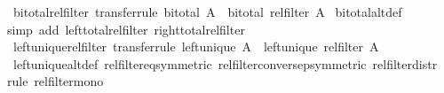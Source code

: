 \begin{isabellebody}
{\isafoldproof}%
%
\isadelimproof
\isanewline
%
\endisadelimproof
\isanewline
{}\isamarkupfalse%
\ bi{\isacharunderscore}{\kern0pt}total{\isacharunderscore}{\kern0pt}rel{\isacharunderscore}{\kern0pt}filter\ {\isacharbrackleft}{\kern0pt}transfer{\isacharunderscore}{\kern0pt}rule{\isacharbrackright}{\kern0pt}{\isacharcolon}{\kern0pt}\ {\isachardoublequoteopen}bi{\isacharunderscore}{\kern0pt}total\ A\ {\isasymLongrightarrow}\ bi{\isacharunderscore}{\kern0pt}total\ {\isacharparenleft}{\kern0pt}rel{\isacharunderscore}{\kern0pt}filter\ A{\isacharparenright}{\kern0pt}{\isachardoublequoteclose}\isanewline
%
\isadelimproof
%
\endisadelimproof
%
\isatagproof
{}\isamarkupfalse%
\ bi{\isacharunderscore}{\kern0pt}total{\isacharunderscore}{\kern0pt}alt{\isacharunderscore}{\kern0pt}def\ \isamarkupfalse%
{\isacharparenleft}{\kern0pt}simp\ add{\isacharcolon}{\kern0pt}\ left{\isacharunderscore}{\kern0pt}total{\isacharunderscore}{\kern0pt}rel{\isacharunderscore}{\kern0pt}filter\ right{\isacharunderscore}{\kern0pt}total{\isacharunderscore}{\kern0pt}rel{\isacharunderscore}{\kern0pt}filter{\isacharparenright}{\kern0pt}%
\endisatagproof
{\isafoldproof}%
%
\isadelimproof
\isanewline
%
\endisadelimproof
\isanewline
{}\isamarkupfalse%
\ left{\isacharunderscore}{\kern0pt}unique{\isacharunderscore}{\kern0pt}rel{\isacharunderscore}{\kern0pt}filter\ {\isacharbrackleft}{\kern0pt}transfer{\isacharunderscore}{\kern0pt}rule{\isacharbrackright}{\kern0pt}{\isacharcolon}{\kern0pt}\ {\isachardoublequoteopen}left{\isacharunderscore}{\kern0pt}unique\ A\ {\isasymLongrightarrow}\ left{\isacharunderscore}{\kern0pt}unique\ {\isacharparenleft}{\kern0pt}rel{\isacharunderscore}{\kern0pt}filter\ A{\isacharparenright}{\kern0pt}{\isachardoublequoteclose}\isanewline
%
\isadelimproof
%
\endisadelimproof
%
\isatagproof
{}\isamarkupfalse%
\ left{\isacharunderscore}{\kern0pt}unique{\isacharunderscore}{\kern0pt}alt{\isacharunderscore}{\kern0pt}def\ rel{\isacharunderscore}{\kern0pt}filter{\isacharunderscore}{\kern0pt}eq{\isacharbrackleft}{\kern0pt}symmetric{\isacharbrackright}{\kern0pt}\ rel{\isacharunderscore}{\kern0pt}filter{\isacharunderscore}{\kern0pt}conversep{\isacharbrackleft}{\kern0pt}symmetric{\isacharbrackright}{\kern0pt}\ rel{\isacharunderscore}{\kern0pt}filter{\isacharunderscore}{\kern0pt}distr\isanewline
{}\isamarkupfalse%
{\isacharparenleft}{\kern0pt}rule\ rel{\isacharunderscore}{\kern0pt}filter{\isacharunderscore}{\kern0pt}mono{\isacharparenright}{\kern0pt}%
\endisatagproof
{\isafoldproof}%
%
\isadelimproof

\end{isabellebody}
